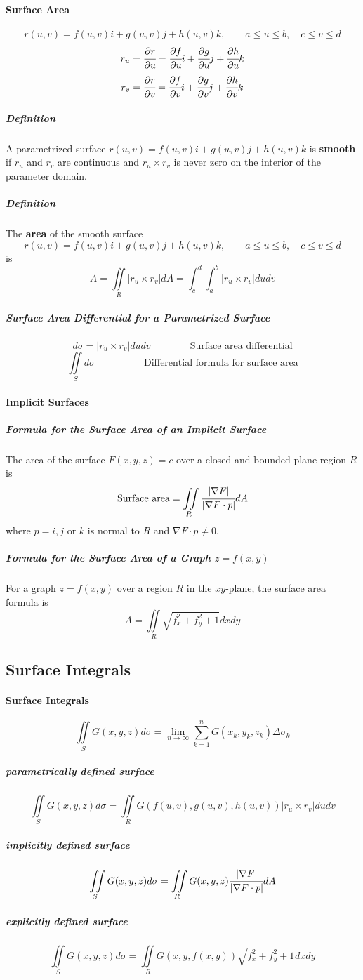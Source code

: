 \documentclass{article}
\begin{document}
            \paragraph{Surface Area}
                \[r(u,v)=f(u,v)i+g(u,v)j+h(u,v)k,\qquad a\le u\le b,\quad c\le v\le d\]
                \[r_u=\cfrac{\partial r}{\partial u}=\cfrac{\partial f}{\partial u}i+\cfrac{\partial g}{\partial u}j+\cfrac{\partial h}{\partial u}k\]
                \[r_v=\cfrac{\partial r}{\partial v}=\cfrac{\partial f}{\partial v}i+\cfrac{\partial g}{\partial v}j+\cfrac{\partial h}{\partial v}k\]
                \subparagraph{Definition} A parametrized surface $r(u,v)=f(u,v)i+g(u,v)j+h(u,v)k$ is \textbf{smooth} if $r_u$ and $r_v$ are continuous and $r_u\times r_v$ is never zero on the interior of the parameter domain.
                \subparagraph{Definition} The \textbf{area} of the smooth surface
                \[r(u,v)=f(u,v)i+g(u,v)j+h(u,v)k,\qquad a\le u\le b,\quad c\le v\le d\]
                is
                \[A=\iint\limits_R|r_u\times r_v|dA=\int_c^d\int_a^b|r_u\times r_v|dudv\]
                \subparagraph{Surface Area Differential for a Parametrized Surface}
                \[d\sigma=|r_u\times r_v|dudv\qquad\qquad\text{Surface area differential}\] 
                \[\iint\limits_Sd\sigma\qquad\qquad\quad\text{Differential formula for surface area}\]
            \paragraph{Implicit Surfaces}
                \subparagraph{Formula for the Surface Area of an Implicit Surface}
                    The area of the surface $F(x,y,z)=c$ over a closed and bounded plane region $R$ is 
                    \[\text{Surface area}=\iint\limits_R\cfrac{|\nabla F|}{|\nabla F\cdot p|}dA\]
                    where $p=i,j$ or $k$ is normal to $R$ and $\nabla F\cdot p\ne 0$. 
                \subparagraph{Formula for the Surface Area of a Graph $z=f(x,y)$}
                For a graph $z=f(x,y)$ over a region $R$ in the $xy$-plane, the surface area formula is 
                \[A=\iint\limits_R\sqrt{f_x^2+f_y^2+1}dxdy\]
        \subsection{Surface Integrals}
            \paragraph{Surface Integrals}
                \[\iint\limits_SG(x,y,z)d\sigma=\lim\limits_{n\to\infty}\sum_{k=1}^nG(x_k,y_k,z_k)\Delta\sigma_k\]
                \subparagraph{parametrically defined surface}
                \[\iint\limits_SG(x,y,z)d\sigma=\iint\limits_RG(f(u,v),g(u,v),h(u,v))|r_u\times r_v|dudv\]
                \subparagraph{implicitly defined surface}
                \[\iint\limits_SG(x,y,z)d\sigma=\iint\limits_RG(x,y,z)\cfrac{|\nabla F|}{|\nabla F\cdot p|}dA\]
                \subparagraph{explicitly defined surface}
                \[\iint\limits_SG(x,y,z)d\sigma=\iint\limits_RG(x,y,f(x,y))\sqrt{f_x^2+f_y^2+1}dxdy\]
\end{document}
